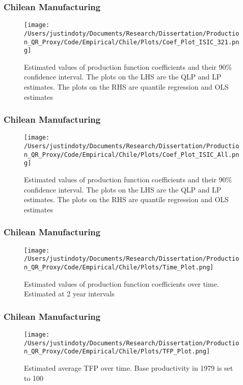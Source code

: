 \documentclass{beamer}
\begin{document}
\begin{frame}
\frametitle{Chilean Manufacturing}
\begin{figure}[ht]
\centering
\texttt{[image: /Users/justindoty/Documents/Research/Dissertation/Production\_QR\_Proxy/Code/Empirical/Chile/Plots/Coef\_Plot\_ISIC\_321.png]}
\caption{Estimated values of production function coefficients and their 90\% confidence interval. The plots on the LHS are the QLP and LP estimates. The plots on the RHS are quantile regression and OLS estimates}
\end{figure}
\end{frame}

\begin{frame}
\frametitle{Chilean Manufacturing}
\begin{figure}[ht]
\centering
\texttt{[image: /Users/justindoty/Documents/Research/Dissertation/Production\_QR\_Proxy/Code/Empirical/Chile/Plots/Coef\_Plot\_ISIC\_All.png]}
\caption{Estimated values of production function coefficients and their 90\% confidence interval. The plots on the LHS are the QLP and LP estimates. The plots on the RHS are quantile regression and OLS estimates}
\end{figure}
\end{frame}

\begin{frame}
\frametitle{Chilean Manufacturing}
\begin{figure}[ht]
\centering
\texttt{[image: /Users/justindoty/Documents/Research/Dissertation/Production\_QR\_Proxy/Code/Empirical/Chile/Plots/Time\_Plot.png]}
\caption{Estimated values of production function coefficients over time. Estimated at 2 year intervals}
\end{figure}
\end{frame}

\begin{frame}
\frametitle{Chilean Manufacturing}
\begin{figure}[ht]
\centering
\texttt{[image: /Users/justindoty/Documents/Research/Dissertation/Production\_QR\_Proxy/Code/Empirical/Chile/Plots/TFP\_Plot.png]}
\caption{Estimated average TFP over time. Base productivity in 1979 is set to 100}
\end{figure}
\end{frame}
\end{document}
